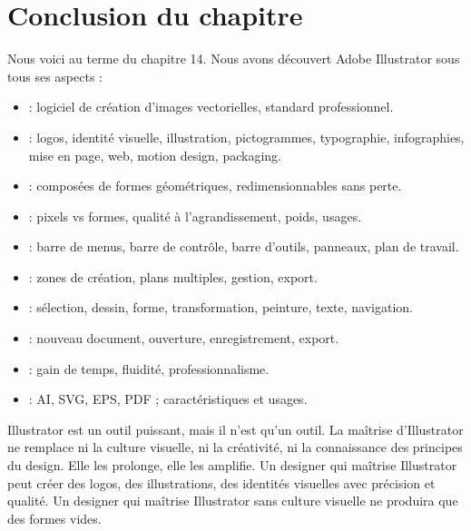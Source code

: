 \section*{Conclusion du chapitre}

Nous voici au terme du chapitre 14. Nous avons découvert Adobe Illustrator sous tous ses aspects :

\begin{itemize}
    \item {} : logiciel de création d'images vectorielles, standard professionnel.
    \item {} : logos, identité visuelle, illustration, pictogrammes, typographie, infographies, mise en page, web, motion design, packaging.
    \item {} : composées de formes géométriques, redimensionnables sans perte.
    \item {} : pixels vs formes, qualité à l'agrandissement, poids, usages.
    \item {} : barre de menus, barre de contrôle, barre d'outils, panneaux, plan de travail.
    \item {} : zones de création, plans multiples, gestion, export.
    \item {} : sélection, dessin, forme, transformation, peinture, texte, navigation.
    \item {} : nouveau document, ouverture, enregistrement, export.
    \item {} : gain de temps, fluidité, professionnalisme.
    \item {} : AI, SVG, EPS, PDF ; caractéristiques et usages.
\end{itemize}

Illustrator est un outil puissant, mais il n'est qu'un outil. La maîtrise d'Illustrator ne remplace ni la culture visuelle, ni la créativité, ni la connaissance des principes du design. Elle les prolonge, elle les amplifie. Un designer qui maîtrise Illustrator peut créer des logos, des illustrations, des identités visuelles avec précision et qualité. Un designer qui maîtrise Illustrator sans culture visuelle ne produira que des formes vides.

